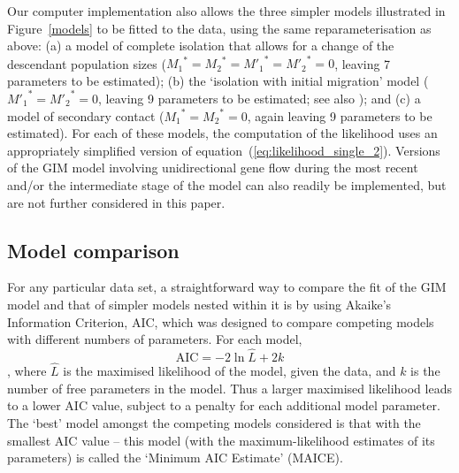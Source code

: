 \documentclass[11pt]{article}
\begin{document}
Our computer implementation also allows the three simpler models illustrated in Figure~\ref{models} to be fitted to the data, using the same reparameterisation as above:
(a) a model of complete isolation that allows for a change of the descendant population sizes (${M_1}^{\!*}={M_2}^{\!*}={M'_1}^{*}={M'_2}^{*}=0$, leaving 7 parameters to be estimated);
(b) the `isolation with initial migration' model (${M'_1}^{*}={M'_2}^{*}=0$, leaving 9 parameters to be estimated; see also \citealp{Costa2017}); 
and (c) a model of secondary contact  (${M_1}^{\!*}={M_2}^{\!*}=0$, again leaving 9 parameters to be estimated). 
For each of these models, the computation of the likelihood uses an appropriately simplified version of equation~(\ref{eq:likelihood_single_2}).
Versions of the GIM model involving unidirectional gene flow during the most recent and/or the intermediate stage of the model can also readily be implemented,
but 
are not further considered in this paper.

\subsection{Model comparison}
\label{subsection: model comparison}

For any particular data set, a straightforward way
to compare the fit of the GIM model and that of simpler models nested within it
is by 
using Akaike's Information Criterion, AIC, which was designed to compare
competing models with different numbers of parameters.
For each model,
$$
\mbox{AIC} = -2 \ln\hat{L} +2k
$$
\citep{Akaike1972, Akaike1974}, where $\hat{L}$ is the maximised likelihood of the model, given the data, and $k$ is the number of free parameters in the model.
Thus a larger maximised likelihood leads to a lower AIC value, 
subject to a penalty for each additional model parameter.
The `best' model amongst the competing models considered is that with the smallest AIC value -- this model (with the maximum-likelihood estimates of its parameters) is called the `Minimum AIC Estimate' (MAICE). 
\end{document}
